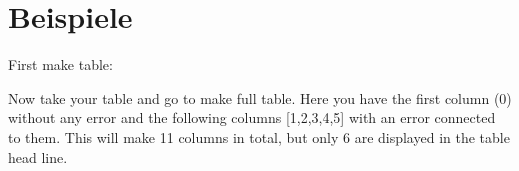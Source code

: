 \section{Beispiele}
First make table:

Now take your table and go to make full table. Here you have the first column (0) without any error and the following columns [1,2,3,4,5] with an error connected to them. This will make 11 columns in total, but only 6 are displayed in the table head line.

